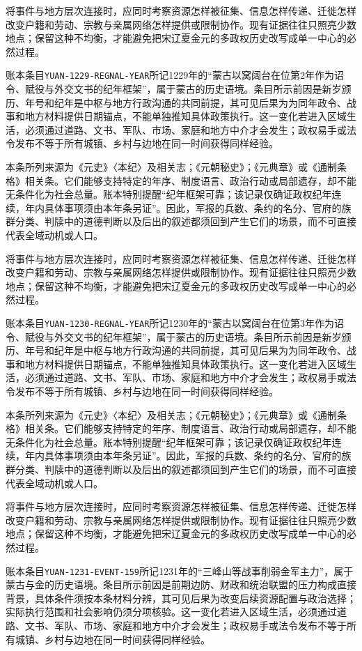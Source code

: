 将事件与地方层次连接时，应同时考察资源怎样被征集、信息怎样传递、迁徙怎样改变户籍和劳动、宗教与亲属网络怎样提供或限制协作。现有证据往往只照亮少数地点；保留这种不均衡，才能避免把宋辽夏金元的多政权历史改写成单一中心的必然过程。

账本条目\texttt{YUAN-1229-REGNAL-YEAR}所记1229年的“蒙古以窝阔台在位第2年作为诏令、赋役与外交文书的纪年框架”，属于蒙古的历史语境。条目所示前因是新岁颁历、年号和纪年是中枢与地方行政沟通的共同前提，其可见后果为为同年政令、战事和地方材料提供日期锚点，不能单独推知具体政策执行。这一变化若进入区域生活，必须通过道路、文书、军队、市场、家庭和地方中介才会发生；政权易手或法令发布不等于所有城镇、乡村与边地在同一时间获得同样经验。

本条所列来源为《元史》〈本纪〉及相关志；《元朝秘史》；《元典章》或《通制条格》相关条。它们能够支持特定的年序、制度语言、政治行动或局部遗存，却不能无条件化为社会总量。账本特别提醒“纪年框架可靠；该记录仅确证政权纪年连续，年内具体事项须由本年条另证”。因此，军报的兵数、条约的名分、官府的族群分类、判牍中的道德判断以及后出的叙述都须回到产生它们的场景，而不可直接代表全域动机或人口。

将事件与地方层次连接时，应同时考察资源怎样被征集、信息怎样传递、迁徙怎样改变户籍和劳动、宗教与亲属网络怎样提供或限制协作。现有证据往往只照亮少数地点；保留这种不均衡，才能避免把宋辽夏金元的多政权历史改写成单一中心的必然过程。

账本条目\texttt{YUAN-1230-REGNAL-YEAR}所记1230年的“蒙古以窝阔台在位第3年作为诏令、赋役与外交文书的纪年框架”，属于蒙古的历史语境。条目所示前因是新岁颁历、年号和纪年是中枢与地方行政沟通的共同前提，其可见后果为为同年政令、战事和地方材料提供日期锚点，不能单独推知具体政策执行。这一变化若进入区域生活，必须通过道路、文书、军队、市场、家庭和地方中介才会发生；政权易手或法令发布不等于所有城镇、乡村与边地在同一时间获得同样经验。

本条所列来源为《元史》〈本纪〉及相关志；《元朝秘史》；《元典章》或《通制条格》相关条。它们能够支持特定的年序、制度语言、政治行动或局部遗存，却不能无条件化为社会总量。账本特别提醒“纪年框架可靠；该记录仅确证政权纪年连续，年内具体事项须由本年条另证”。因此，军报的兵数、条约的名分、官府的族群分类、判牍中的道德判断以及后出的叙述都须回到产生它们的场景，而不可直接代表全域动机或人口。

将事件与地方层次连接时，应同时考察资源怎样被征集、信息怎样传递、迁徙怎样改变户籍和劳动、宗教与亲属网络怎样提供或限制协作。现有证据往往只照亮少数地点；保留这种不均衡，才能避免把宋辽夏金元的多政权历史改写成单一中心的必然过程。

账本条目\texttt{YUAN-1231-EVENT-159}所记1231年的“三峰山等战事削弱金军主力”，属于蒙古与金的历史语境。条目所示前因是前期边防、财政和统治联盟的压力构成直接背景，具体条件须按本条材料分辨，其可见后果为改变后续资源配置与政治选择；实际执行范围和社会影响仍须分项核验。这一变化若进入区域生活，必须通过道路、文书、军队、市场、家庭和地方中介才会发生；政权易手或法令发布不等于所有城镇、乡村与边地在同一时间获得同样经验。

